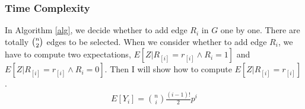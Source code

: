 \subsubsection{Time Complexity }
In Algorithm \ref{alg}, we decide whether to add edge $R_i$ in $G$ one by one. There are totally $\tbinom{n}{2}$ edges to be selected.
When we consider whether to add edge $R_i$, we have to compute two expectations, $E[Z|R_{[i]}=r_{[i]}\wedge R_i=1]$ and $E[Z|R_{[i]}=r_{[i]}\wedge R_i=0]$. Then I will show how to compute $E[Z|R_{[i]}=r_{[i]}]$.
\begin{align}
E[Y_i]=\binom{n}{i}\frac{(i-1)!}{2}p^i    
\end{align}

